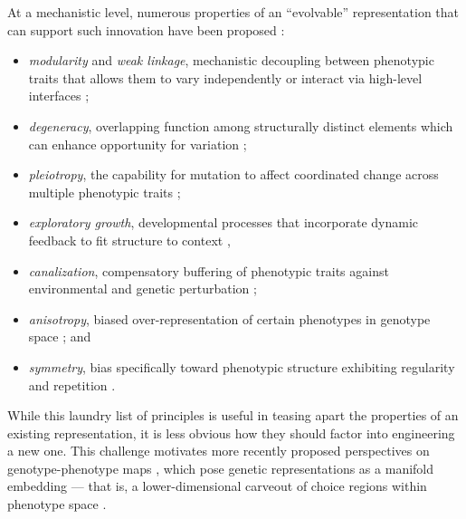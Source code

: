 At a mechanistic level, numerous  properties of an ``evolvable'' representation that can support such innovation have been proposed \citep{moreno2017evolvability}:
\begin{itemize}
\item \textit{modularity} and \textit{weak linkage}, mechanistic decoupling between phenotypic traits that allows them to vary independently or interact via high-level interfaces \citep{kirschner1998evolvability,downing2015intelligence,kashtan2005spontaneous,kashtan2007varying,wilder2015reconciling,owens2003quest};
\item \textit{degeneracy}, overlapping function among structurally distinct elements which can enhance opportunity for variation \citep{whitacre2010degeneracy,wagner2003evolutionary};
\item \textit{pleiotropy}, the capability for mutation to affect coordinated change across multiple phenotypic traits \citep{rimbault2013derived,cheney2014unshackling};
\item \textit{exploratory growth}, developmental processes that incorporate dynamic feedback to fit structure to context \citep{kirschner1998evolvability,downing2015intelligence},
\item \textit{canalization}, compensatory buffering of phenotypic traits against environmental and genetic perturbation \citep{gibson2004uncovering,paaby2014cryptic};
\item \textit{anisotropy}, biased over-representation of certain phenotypes in genotype space \citep{schaper2014arrival,borenstein2008end,brunusan2025minimal,rohner2025macroevolution,herreralvarez2025structure}; and
\item \textit{symmetry}, bias specifically toward phenotypic structure exhibiting regularity and repetition \citep{coyne1987lack,clune2011performance,tonelli2013relationships,cheney2014unshackling}.
\end{itemize}

While this laundry list of principles is useful in teasing apart the properties of an existing representation, it is less obvious how they should factor into engineering a new one.
This challenge motivates more recently proposed perspectives on genotype-phenotype maps \citep{lehman2023evolution,moreno2018learning,bentley2022evolving,gaier2020discovering,wittenberg2023denoising,bontrager2018deepmasterprints,rodrigueztorrado2020bootstrapping,volz2018evolving,rakicevic2021policy,thakkar2019autoencoder,yosinski2012visually,feng2017autoencoding,stuurman2023approach,li2024generating,song2024morphvae}, which pose genetic representations as a manifold embedding --- that is, a lower-dimensional carveout of choice regions within phenotype space  \citep{tenenbaum2000global,roweis2000nonlinear}.

